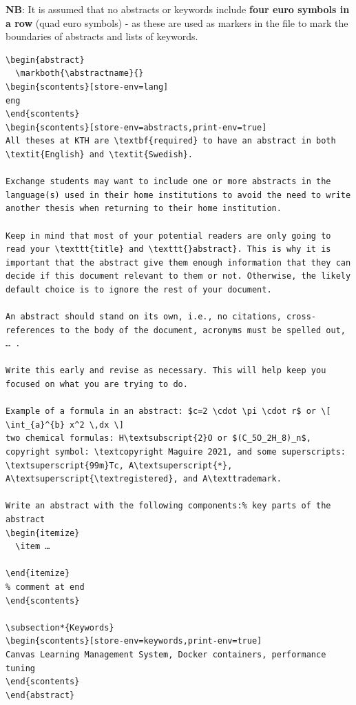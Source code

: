 \textbf{NB}: It is assumed that no abstracts or keywords include \textbf{four euro symbols in a row} (\ie quad euro symbols) - as these are used as markers in the file to mark the boundaries of abstracts and lists of keywords.
\begin{lstlisting}[language={[LaTeX]TeX}, caption={Storing the language in a scontents buffer named "lang"}, label=lst:EnglishAbstract]
\begin{abstract}
  \markboth{\abstractname}{}
\begin{scontents}[store-env=lang]
eng
\end{scontents}
\begin{scontents}[store-env=abstracts,print-env=true]
All theses at KTH are \textbf{required} to have an abstract in both \textit{English} and \textit{Swedish}.

Exchange students may want to include one or more abstracts in the language(s) used in their home institutions to avoid the need to write another thesis when returning to their home institution.

Keep in mind that most of your potential readers are only going to read your \texttt{title} and \texttt{}abstract}. This is why it is important that the abstract give them enough information that they can decide if this document relevant to them or not. Otherwise, the likely default choice is to ignore the rest of your document.

An abstract should stand on its own, i.e., no citations, cross-references to the body of the document, acronyms must be spelled out, … .

Write this early and revise as necessary. This will help keep you focused on what you are trying to do.

Example of a formula in an abstract: $c=2 \cdot \pi \cdot r$ or \[ \int_{a}^{b} x^2 \,dx \]
two chemical formulas: H\textsubscript{2}O or $(C_5O_2H_8)_n$, copyright symbol: \textcopyright Maguire 2021, and some superscripts: \textsuperscript{99m}Tc, A\textsuperscript{*},
A\textsuperscript{\textregistered}, and A\texttrademark.

Write an abstract with the following components:% key parts of the abstract
\begin{itemize}
  \item …

\end{itemize}
% comment at end
\end{scontents}

\subsection*{Keywords}
\begin{scontents}[store-env=keywords,print-env=true]
Canvas Learning Management System, Docker containers, performance tuning
\end{scontents}
\end{abstract}
\end{lstlisting}



